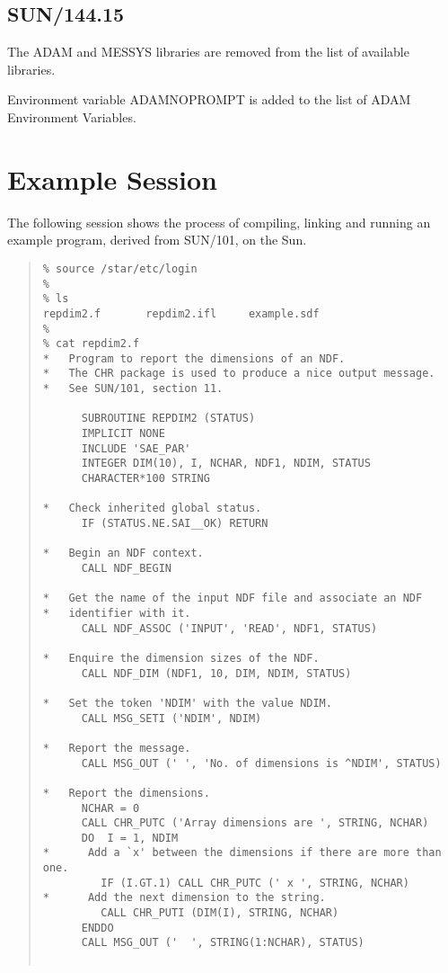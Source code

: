 \documentclass[twoside,11pt]{article}
\newcommand{\htmlref}[2]{#1}
\newcommand{\xref}[3]{#1}
\newcommand{\xlabel}[1]{}
\renewcommand{\_}{\texttt{\symbol{95}}}
\begin{document}
\subsection{SUN/144.15}
The ADAM and MESSYS libraries are removed from the list of
\htmlref{available libraries}{libs}.

Environment variable ADAM\_NOPROMPT is added to the list of
\htmlref{ADAM Environment Variables}{envars}.
\newpage
\appendix
\section{\xlabel{example_session}Example Session}
The following session shows the process of compiling, linking and running an
example program, derived from 
\xref{SUN/101}{sun101}{},
on the Sun.

\begin{quote} \begin{verbatim}
% source /star/etc/login
%
% ls
repdim2.f       repdim2.ifl     example.sdf
%
% cat repdim2.f
*   Program to report the dimensions of an NDF.
*   The CHR package is used to produce a nice output message.
*   See SUN/101, section 11.

      SUBROUTINE REPDIM2 (STATUS)                                
      IMPLICIT NONE
      INCLUDE 'SAE_PAR'                                       
      INTEGER DIM(10), I, NCHAR, NDF1, NDIM, STATUS
      CHARACTER*100 STRING

*   Check inherited global status.
      IF (STATUS.NE.SAI__OK) RETURN

*   Begin an NDF context.    
      CALL NDF_BEGIN                                          
                                                              
*   Get the name of the input NDF file and associate an NDF 
*   identifier with it.
      CALL NDF_ASSOC ('INPUT', 'READ', NDF1, STATUS)
                                                              
*   Enquire the dimension sizes of the NDF.
      CALL NDF_DIM (NDF1, 10, DIM, NDIM, STATUS)

*   Set the token 'NDIM' with the value NDIM.
      CALL MSG_SETI ('NDIM', NDIM)

*   Report the message.
      CALL MSG_OUT (' ', 'No. of dimensions is ^NDIM', STATUS) 

*   Report the dimensions.
      NCHAR = 0
      CALL CHR_PUTC ('Array dimensions are ', STRING, NCHAR)
      DO  I = 1, NDIM
*      Add a `x' between the dimensions if there are more than one.
         IF (I.GT.1) CALL CHR_PUTC (' x ', STRING, NCHAR)
*      Add the next dimension to the string.
         CALL CHR_PUTI (DIM(I), STRING, NCHAR)
      ENDDO
      CALL MSG_OUT ('  ', STRING(1:NCHAR), STATUS) 


\end{verbatim}
\end{quote}
\end{document}
